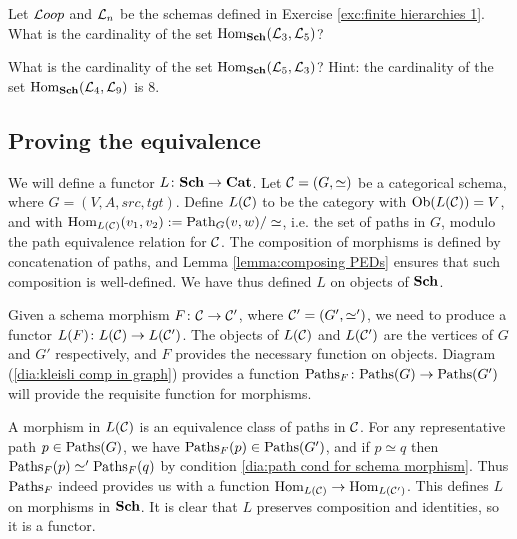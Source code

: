 \begin{exercise}
Let ${\mathcal{L} oop}$ and $\mathcal{L}_n$ be the schemas defined in Exercise \ref{exc:finite hierarchies 1}.
\sexc What is the cardinality of the set $\textnormal{Hom}_{\bf Sch}(\mathcal{L}_3,\mathcal{L}_5)$?
\item What is the cardinality of the set $\textnormal{Hom}_{\bf Sch}(\mathcal{L}_5,\mathcal{L}_3)$? Hint: the cardinality of the set $\textnormal{Hom}_{\bf Sch}(\mathcal{L}_4,\mathcal{L}_9)$ is 8.
\endsexc
\end{exercise}


\subsection{Proving the equivalence}\label{sec:proof of cat=sch}

\begin{construction}

We will define a functor $L\colon{\bf Sch}\rightarrow{\bf Cat}$. Let $\mathcal{C}=(G,\simeq)$ be a categorical schema, where $G=(V,A,src,tgt)$. Define $L(\mathcal{C})$ to be the category with $\textnormal{Ob}(L(\mathcal{C}))=V$, and with $\textnormal{Hom}_{L(\mathcal{C})}(v_1,v_2):=\textnormal{Path}_G(v,w)/\simeq$, i.e. the set of paths in $G$, modulo the path equivalence relation for $\mathcal{C}$. The composition of morphisms is defined by concatenation of paths, and Lemma \ref{lemma:composing PEDs} ensures that such composition is well-defined. We have thus defined $L$ on objects of ${\bf Sch}$.

Given a schema morphism $F\colon\mathcal{C}\rightarrow\mathcal{C}'$, where $\mathcal{C}'=(G',\simeq')$, we need to produce a functor $L(F)\colon L(\mathcal{C})\rightarrow L(\mathcal{C}')$. The objects of $L(\mathcal{C})$ and $L(\mathcal{C}')$ are the vertices of $G$ and $G'$ respectively, and $F$ provides the necessary function on objects. Diagram (\ref{dia:kleisli comp in graph}) provides a function $\textnormal{Paths}_F\colon\textnormal{Paths}(G)\rightarrow\textnormal{Paths}(G')$ will provide the requisite function for morphisms. 

A morphism in $L(\mathcal{C})$ is an equivalence class of paths in $\mathcal{C}$. For any representative path $p\in\textnormal{Paths}(G)$, we have $\textnormal{Paths}_F(p)\in\textnormal{Paths}(G')$, and if $p\simeq q$ then $\textnormal{Paths}_F(p)\simeq'\textnormal{Paths}_F(q)$ by condition \ref{dia:path cond for schema morphism}. Thus $\textnormal{Paths}_F$ indeed provides us with a function $\textnormal{Hom}_{L(\mathcal{C})}\rightarrow\textnormal{Hom}_{L(\mathcal{C}')}$. This defines $L$ on morphisms in ${\bf Sch}$. It is clear that $L$ preserves composition and identities, so it is a functor.

\end{construction}

